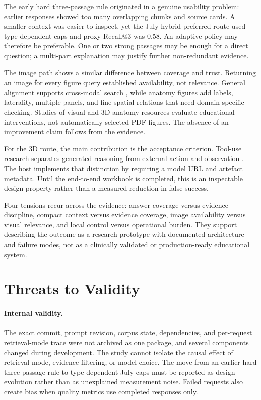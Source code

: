 The early hard three-passage rule originated in a genuine usability problem: earlier responses showed too many overlapping chunks and source cards. A smaller context was easier to inspect, yet the July hybrid-preferred route used type-dependent caps and proxy Recall@3 was 0.58. An adaptive policy may therefore be preferable. One or two strong passages may be enough for a direct question; a multi-part explanation may justify further non-redundant evidence.

The image path shows a similar difference between coverage and trust. Returning an image for every figure query established availability, not relevance. General \CLIP{} alignment supports cross-modal search \parencite{radford2021}, while anatomy figures add labels, laterality, multiple panels, and fine spatial relations that need domain-specific checking. Studies of visual and 3D anatomy resources \parencite{yammine2015,moro2017} evaluate educational interventions, not automatically selected PDF figures. The absence of an improvement claim follows from the evidence.

For the 3D route, the main contribution is the acceptance criterion. Tool-use research separates generated reasoning from external action and observation \parencite{yao2023react,schick2023toolformer}. The host implements that distinction by requiring a model URL and artefact metadata. Until the end-to-end workbook is completed, this is an inspectable design property rather than a measured reduction in false success.

Four tensions recur across the evidence: answer coverage versus evidence discipline, compact context versus evidence coverage, image availability versus visual relevance, and local control versus operational burden. They support describing the outcome as a research prototype with documented architecture and failure modes, not as a clinically validated or production-ready educational system.

\section{Threats to Validity}
\label{sec:results-threats}

\paragraph{Internal validity.}
The exact commit, prompt revision, corpus state, dependencies, and per-request retrieval-mode trace were not archived as one package, and several components changed during development. The study cannot isolate the causal effect of retrieval mode, evidence filtering, or model choice. The move from an earlier hard three-passage rule to type-dependent July caps must be reported as design evolution rather than as unexplained measurement noise. Failed requests also create bias when quality metrics use completed responses only.


